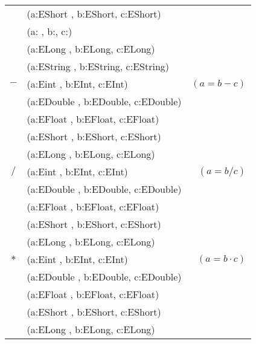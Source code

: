 \begin{center}
\begin{tabular}{| c| l | r |}
 & (a:EShort , b:EShort, c:EShort) & \\ 
 & (a: , b:, c:) & \\
 & (a:ELong , b:ELong, c:ELong) &  \\ 
 & (a:EString , b:EString, c:EString) & \\\hline
$-$ & (a:Eint , b:EInt, c:EInt) & $(a=b-c)$ \\ 
 & (a:EDouble , b:EDouble, c:EDouble) & \\ 
 & (a:EFloat , b:EFloat, c:EFloat) &  \\ 
 & (a:EShort , b:EShort, c:EShort) & \\ 
 & (a:ELong , b:ELong, c:ELong) &  \\ \hline
$ /$ & (a:Eint , b:EInt, c:EInt) & $(a=b/c)$ \\ 
 & (a:EDouble , b:EDouble, c:EDouble) & \\ 
 & (a:EFloat , b:EFloat, c:EFloat) &  \\ 
 & (a:EShort , b:EShort, c:EShort) & \\ 
 & (a:ELong , b:ELong, c:ELong) &  \\ \hline
$ *$ & (a:Eint , b:EInt, c:EInt) & $(a=b\cdot c)$ \\ 
 & (a:EDouble , b:EDouble, c:EDouble) & \\ 
 & (a:EFloat , b:EFloat, c:EFloat) &  \\ 
 & (a:EShort , b:EShort, c:EShort) & \\ 
 & (a:ELong , b:ELong, c:ELong) &  \\ \hline



\end{tabular} 
\end{center}


   
